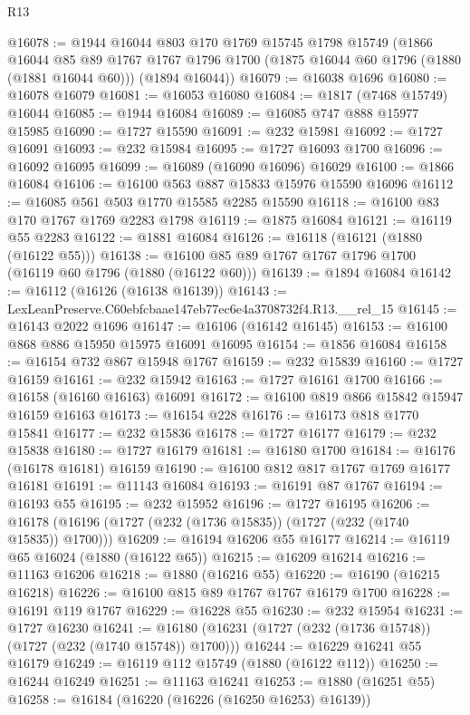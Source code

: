 \begin{lexlean}{R13}
\begin{coremodule}
@16078 := @1944
    @16044
    @803
    @170
    @1769
    @15745
    @1798
    @15749
    (@1866
      @16044
      @85
      @89
      @1767
      @1767
      @1796
      @1700
      (@1875 @16044 @60 @1796 (@1880 (@1881 @16044 @60)))
      (@1894 @16044))
@16079 := @16038 @1696
@16080 := @16078 @16079
@16081 := @16053 @16080
@16084 := @1817 (@7468 @15749) @16044
@16085 := @1944 @16084
@16089 := @16085 @747 @888 @15977 @15985
@16090 := @1727 @15590
@16091 := @232 @15981
@16092 := @1727 @16091
@16093 := @232 @15984
@16095 := @1727 @16093 @1700
@16096 := @16092 @16095
@16099 := @16089 (@16090 @16096) @16029
@16100 := @1866 @16084
@16106 := @16100 @563 @887 @15833 @15976 @15590 @16096
@16112 := @16085 @561 @503 @1770 @15585 @2285 @15590
@16118 := @16100 @83 @170 @1767 @1769 @2283 @1798
@16119 := @1875 @16084
@16121 := @16119 @55 @2283
@16122 := @1881 @16084
@16126 := @16118 (@16121 (@1880 (@16122 @55)))
@16138 := @16100 @85 @89 @1767 @1767 @1796 @1700 (@16119 @60 @1796 (@1880 (@16122 @60)))
@16139 := @1894 @16084
@16142 := @16112 (@16126 (@16138 @16139))
@16143 := LexLeanPreserve.C60ebfcbaae147eb77ec6e4a3708732f4.R13.__rel_15
@16145 := @16143 @2022 @1696
@16147 := @16106 (@16142 @16145)
@16153 := @16100 @868 @886 @15950 @15975 @16091 @16095
@16154 := @1856 @16084
@16158 := @16154 @732 @867 @15948 @1767
@16159 := @232 @15839
@16160 := @1727 @16159
@16161 := @232 @15942
@16163 := @1727 @16161 @1700
@16166 := @16158 (@16160 @16163) @16091
@16172 := @16100 @819 @866 @15842 @15947 @16159 @16163
@16173 := @16154 @228
@16176 := @16173 @818 @1770 @15841
@16177 := @232 @15836
@16178 := @1727 @16177
@16179 := @232 @15838
@16180 := @1727 @16179
@16181 := @16180 @1700
@16184 := @16176 (@16178 @16181) @16159
@16190 := @16100 @812 @817 @1767 @1769 @16177 @16181
@16191 := @11143 @16084
@16193 := @16191 @87 @1767
@16194 := @16193 @55
@16195 := @232 @15952
@16196 := @1727 @16195
@16206 := @16178 (@16196 (@1727 (@232 (@1736 @15835)) (@1727 (@232 (@1740 @15835)) @1700)))
@16209 := @16194 @16206 @55 @16177
@16214 := @16119 @65 @16024 (@1880 (@16122 @65))
@16215 := @16209 @16214
@16216 := @11163 @16206
@16218 := @1880 (@16216 @55)
@16220 := @16190 (@16215 @16218)
@16226 := @16100 @815 @89 @1767 @1767 @16179 @1700
@16228 := @16191 @119 @1767
@16229 := @16228 @55
@16230 := @232 @15954
@16231 := @1727 @16230
@16241 := @16180 (@16231 (@1727 (@232 (@1736 @15748)) (@1727 (@232 (@1740 @15748)) @1700)))
@16244 := @16229 @16241 @55 @16179
@16249 := @16119 @112 @15749 (@1880 (@16122 @112))
@16250 := @16244 @16249
@16251 := @11163 @16241
@16253 := @1880 (@16251 @55)
@16258 := @16184 (@16220 (@16226 (@16250 @16253) @16139))

\end{coremodule}
\end{lexlean}
